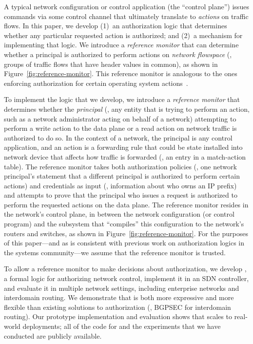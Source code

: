 A typical network configuration or control application (the ``control
plane'') issues commands via some control channel that ultimately
translate to {\em actions} on traffic flows. In this paper, we develop
(1)~an authorization logic that determines whether any particular
requested action is authorized; and (2)~a mechanism for implementing
that logic.  We introduce a {\em reference monitor} that can determine
whether a principal is authorized to perform actions on {\em network
  flowspace} (\ie, groups of traffic flows that have header values in
common), as shown in Figure~\ref{fig:reference-monitor}. This reference
monitor is analogous to the ones enforcing authorization for certain
operating system actions~\cite{taos}. 

To implement the logic that we develop, we introduce a {\em reference
  monitor} that determines whether the {\em principal} (\ie, any entity
that is trying to perform an action, such as a network administrator
acting on behalf of a network) attempting to perform a write action to
the data plane or a read action on network traffic is authorized to do
so.  In the context of a network, the principal is any control
application, and an action is a forwarding rule that could be state
installed into network device that affects how traffic is forwarded
(\eg, an entry in a match-action table).  The reference monitor takes
both authorization policies (\eg, one network principal's statement that
a different principal is authorized to perform certain actions) and
credentials as input (\eg, information about who owns an IP prefix) and
attempts to prove that the principal who issues a request is authorized
to perform the requested actions on the data plane.  The reference
monitor resides in the network's control plane, in between the network
configuration (or control program) and the subsystem that ``compiles''
this configuration to the network's routers and switches, as shown in
Figure~\ref{fig:reference-monitor}.  For the purposes of this
paper---and as is consistent with previous work on authorization logics
in the systems community---we assume that the reference monitor is
trusted.

To allow a reference monitor to make decisions about authorization, we
develop \name{}, a formal logic for authorizing network control,
implement it in an SDN controller, and evaluate it in multiple network
settings, including enterprise networks and interdomain
routing.  %
We demonstrate that \name{} is both more expressive and more flexible
than existing solutions to authorization (\ie, BGPSEC for interdomain
routing).  Our prototype implementation and evaluation shows that
\name{} scales to real-world deployments; all of the code for \name{}
and the experiments that we have conducted are publicly available.

